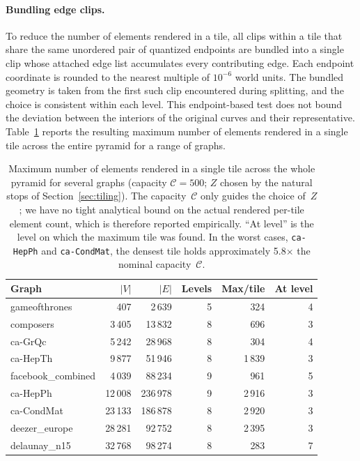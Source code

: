 \documentclass[review]{vgtc}          %
\begin{document}
\paragraph{Bundling edge clips.}
To reduce the number of elements rendered in a tile, all clips within
a tile that share the same unordered pair of quantized endpoints are
bundled into a single clip whose attached edge list accumulates every
contributing edge. Each endpoint coordinate is rounded to the nearest
multiple of $10^{-6}$ world units. The bundled geometry is taken from the first such
clip encountered during splitting, and the choice is consistent within
each level. This endpoint-based test does not bound the deviation
between the interiors of the original curves and their representative.
Table~\ref{tab:max-per-tile} reports the resulting maximum
number of elements rendered in a single tile across the entire pyramid
for a range of graphs.

\begin{table}[t]
\caption{Maximum number of elements rendered in a single tile across
  the whole pyramid for several graphs (capacity $\mathcal{C}=500$;
  $Z$ chosen by the natural stops of Section~\ref{sec:tiling}). The
  capacity~$\mathcal{C}$ only guides the choice of~$Z$; we have no
  tight analytical bound on the actual rendered per-tile element
  count, which is therefore reported empirically. ``At level''
  is the level on which the maximum tile was found. In the worst
  cases, \texttt{ca-HepPh} and \texttt{ca-CondMat}, the densest tile
  holds approximately 5.8$\times$ the nominal capacity~$\mathcal{C}$.}
\label{tab:max-per-tile}
\centering
\scriptsize
\setlength{\tabcolsep}{3.5pt}
\begin{tabular}{lrrrrr}
\toprule
Graph & $|V|$ & $|E|$ & Levels & Max/tile & At level \\
\midrule
gameofthrones      &     407 &   2\,639 & 5 &     324 & 4 \\
composers          &  3\,405 &  13\,832 & 8 &     696 & 3 \\
ca-GrQc            &  5\,242 &  28\,968 & 8 &     304 & 4 \\
ca-HepTh           &  9\,877 &  51\,946 & 8 &  1\,839 & 3 \\
facebook\_combined &  4\,039 &  88\,234 & 9 &     961 & 5 \\
ca-HepPh           & 12\,008 & 236\,978 & 9 &  2\,916 & 3 \\
ca-CondMat         & 23\,133 & 186\,878 & 8 &  2\,920 & 3 \\
deezer\_europe     & 28\,281 &  92\,752 & 8 &  2\,395 & 3 \\
delaunay\_n15      & 32\,768 &  98\,274 & 8 &     283 & 7 \\
\bottomrule
\end{tabular}
\end{table}
\end{document}
